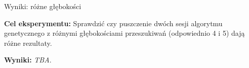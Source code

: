 \begin{frame}{Wyniki: różne głębokości}

    \textbf{Cel eksperymentu:} Sprawdzić czy puszczenie dwóch sesji algorytmu genetycznego z różnymi głębokościami przeszukiwań (odpowiednio 4 i 5) dają różne rezultaty.

    \textbf{Wyniki:}
    \textit{TBA}.






\end{frame}
